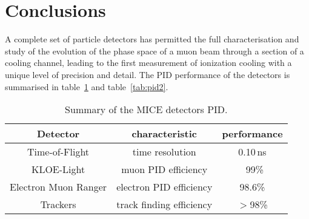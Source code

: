 \graphicspath{{80-Conclusions/Figures/}}

\section{Conclusions}
\label{Sect:Conclusions}

A complete set of particle detectors has permitted the full characterisation and study of the evolution of the phase space of a muon beam through a section of a cooling channel, leading to the first measurement of ionization cooling with a unique level of precision and detail.
The PID performance of the detectors is summarised in table~\ref{tab:pid1} and table~\ref{tab:pid2}.

\begin{table}[htb!]
	\centering
	\begin{tabular}{c|c|c}
	  Detector              & characteristic            & performance \\
		\hline
    Time-of-Flight        & time resolution           & 0.10\,ns    \\
    KLOE-Light            & muon PID efficiency       & ~99\%       \\
    Electron Muon Ranger  & electron PID efficiency   & 98.6\%      \\
    Trackers              & track finding efficiency  & $>$98\%     \\
  \end{tabular}
	\caption{Summary of the MICE detectors PID.}
	\label{tab:pid1}
\end{table}

